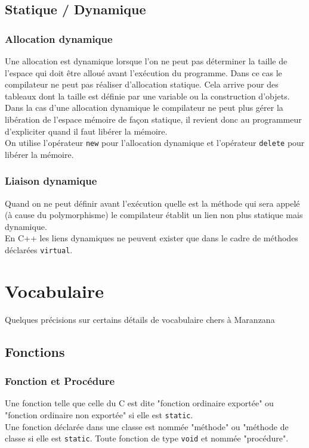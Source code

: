 \documentclass[10pt,a4paper,twoside]{article}
\begin{document}
\subsection{Statique / Dynamique}
\subsubsection{Allocation dynamique}
Une allocation est dynamique lorsque l'on ne peut pas déterminer la taille de l'espace qui doit être alloué avant l'exécution du programme. Dans ce cas le compilateur ne peut pas réaliser d'allocation statique. Cela arrive pour des tableaux dont la taille est définie par une variable ou la construction d'objets.\\
Dans la cas d'une allocation dynamique le compilateur ne peut plus gérer la libération de l'espace mémoire de façon statique, il revient donc au programmeur d'expliciter quand il faut libérer la mémoire.\\
On utilise l'opérateur \verb=new= pour l'allocation dynamique et l'opérateur \verb=delete= pour libérer la mémoire.

\subsubsection{Liaison dynamique}
Quand on ne peut définir avant l'exécution quelle est la méthode qui sera appelé (à cause du polymorphisme) le compilateur établit un lien non plus statique mais dynamique.\\
En C++ les liens dynamiques ne peuvent exister que dans le cadre de méthodes déclarées \verb=virtual=.

\section{Vocabulaire}
Quelques précisions sur certains détails de vocabulaire chers à Maranzana
\subsection{Fonctions}
\subsubsection{Fonction et Procédure}
Une fonction telle que celle du C est dite "fonction ordinaire exportée" ou "fonction ordinaire non exportée" si elle est \verb=static=. \\
Une fonction déclarée dans une classe est nommée "méthode" ou "méthode de classe si elle est \verb=static=. Toute fonction de type \verb=void= et nommée "procédure".
\end{document}
